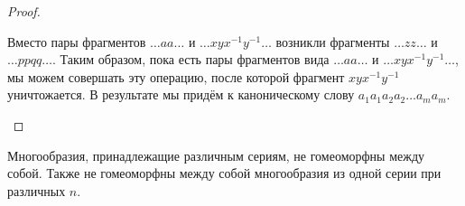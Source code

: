 \begin{proof}
\begin{enumerate}
        Вместо пары фрагментов $\dots aa \dots$ и $\dots xyx^{-1}y^{-1} \dots$ возникли фрагменты $\dots zz \dots$ и $\dots ppqq \dots$. Таким образом, пока есть пары фрагментов вида $\dots aa \dots$ и $\dots xyx^{-1}y^{-1} \dots$, мы можем совершать эту операцию, после которой фрагмент $xyx^{-1}y^{-1}$ уничтожается. В результате мы придём к каноническому слову $a_1a_1a_2a_2 \dots a_ma_m$.
    \end{enumerate}
\end{proof} 

\begin{remark}
    Многообразия, принадлежащие различным сериям, не гомеоморфны между собой. Также не гомеоморфны между собой многообразия из одной серии при различных $n$.
\end{remark}